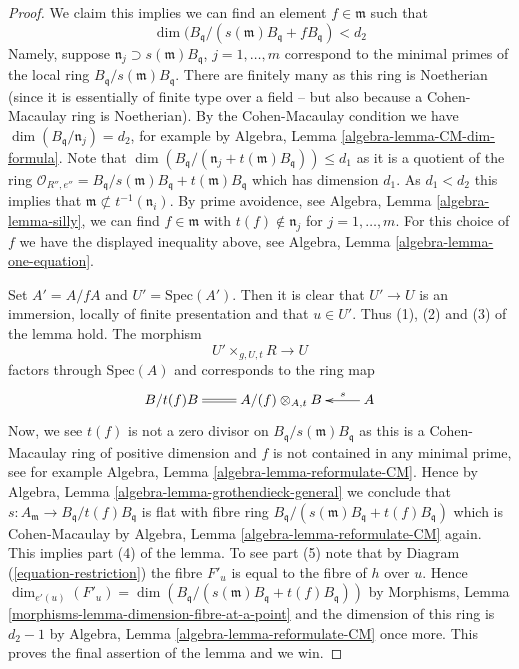 \begin{proof}
\medskip\noindent
We claim this implies we can find
an element $f \in \mathfrak m$ such that
$$
\dim(B_{\mathfrak q}/(s(\mathfrak m)B_{\mathfrak q} + fB_{\mathfrak q}) < d_2
$$
Namely, suppose $\mathfrak n_j \supset s(\mathfrak m)B_{\mathfrak q}$,
$j = 1, \ldots, m$ correspond to the minimal primes of the local ring
$B_{\mathfrak q}/s(\mathfrak m)B_{\mathfrak q}$.
There are finitely many as this ring is Noetherian (since it is essentially
of finite type over a field -- but also because a Cohen-Macaulay ring is
Noetherian). By the Cohen-Macaulay condition we have
$\dim(B_{\mathfrak q}/\mathfrak n_j) = d_2$, for example by
Algebra, Lemma \ref{algebra-lemma-CM-dim-formula}.
Note that
$\dim(B_{\mathfrak q}/(\mathfrak n_j + t(\mathfrak m)B_{\mathfrak q}))
\leq d_1$
as it is a quotient of the ring
$\mathcal{O}_{R'', e''} =
B_{\mathfrak q}/s(\mathfrak m)B_{\mathfrak q} + t(\mathfrak m)B_{\mathfrak q}$
which has dimension $d_1$. As $d_1 < d_2$ this implies that
$\mathfrak m \not \subset t^{-1}(\mathfrak n_i)$.
By prime avoidence, see
Algebra, Lemma \ref{algebra-lemma-silly},
we can find $f \in \mathfrak m$ with $t(f) \not \in \mathfrak n_j$ for
$j = 1, \ldots, m$. For this choice of $f$ we have
the displayed inequality above, see
Algebra, Lemma \ref{algebra-lemma-one-equation}.

\medskip\noindent
Set $A' = A/fA$ and $U' = \text{Spec}(A')$. Then it is clear that
$U' \to U$ is an immersion, locally of finite presentation
and that $u \in U'$. Thus (1), (2) and (3) of the lemma hold.
The morphism
$$
U' \times_{g, U, t} R \longrightarrow U
$$
factors through $\text{Spec}(A)$ and corresponds to the ring map
$$
\xymatrix{
B/t(f)B \ar@{=}[r] & A/(f) \otimes_{A, t} B & A \ar[l]_-s
}
$$
Now, we see $t(f)$ is not a zero divisor on
$B_{\mathfrak q}/s(\mathfrak m)B_{\mathfrak q}$ as this is a
Cohen-Macaulay ring of positive dimension and $f$ is not contained
in any minimal prime, see for example
Algebra, Lemma \ref{algebra-lemma-reformulate-CM}.
Hence by
Algebra, Lemma \ref{algebra-lemma-grothendieck-general}
we conclude that $s : A_{\mathfrak m} \to B_{\mathfrak q}/t(f)B_{\mathfrak q}$
is flat with fibre ring
$B_{\mathfrak q}/(s(\mathfrak m)B_{\mathfrak q} + t(f)B_{\mathfrak q})$
which is Cohen-Macaulay by
Algebra, Lemma \ref{algebra-lemma-reformulate-CM}
again. This implies part (4) of the lemma.
To see part (5) note that by Diagram (\ref{equation-restriction})
the fibre $F'_u$ is equal to the fibre of $h$ over $u$.
Hence
$\dim_{e'(u)}(F'_u) =
\dim(B_{\mathfrak q}/(s(\mathfrak m)B_{\mathfrak q} + t(f)B_{\mathfrak q}))$
by
Morphisms, Lemma \ref{morphisms-lemma-dimension-fibre-at-a-point}
and the dimension of this ring is $d_2 - 1$ by
Algebra, Lemma \ref{algebra-lemma-reformulate-CM}
once more. This proves the final assertion of the lemma and we win.
\end{proof}

